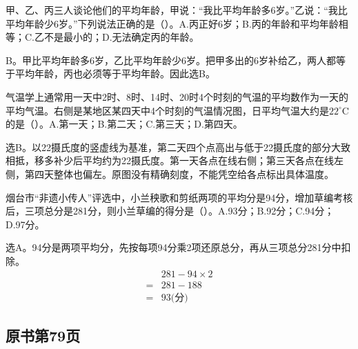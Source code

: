 甲、乙、丙三人谈论他们的平均年龄，甲说：“我比平均年龄多6岁。”乙说：“我比平均年龄少6岁。”下列说法正确的是（\hspace{1.8em}）。A.丙正好6岁；B.丙的年龄和平均年龄相等；C.乙不是最小的；D.无法确定丙的年龄。\par
\begin{BookAnswer}
B。甲比平均年龄多6岁，乙比平均年龄少6岁。把甲多出的6岁补给乙，两人都等于平均年龄，丙也必须等于平均年龄。因此选B。
\end{BookAnswer}

气温学上通常用一天中2时、8时、14时、20时4个时刻的气温的平均数作为一天的平均气温。右侧是某地区某四天中4个时刻的气温情况图，日平均气温大约是\(22^\circ\mathrm C\)的是（\hspace{1.8em}）。A.第一天；B.第二天；C.第三天；D.第四天。\par
{}
\begin{BookAnswer}
选B。以22摄氏度的竖虚线为基准，第二天四个点高出与低于22摄氏度的部分大致相抵，移多补少后平均约为22摄氏度。第一天各点在线右侧；第三天各点在线左侧，第四天整体也偏左。原图没有精确刻度，不能凭空给各点标出具体温度。
\end{BookAnswer}

烟台市“非遗小传人”评选中，小兰秧歌和剪纸两项的平均分是94分，增加草编考核后，三项总分是281分，则小兰草编的得分是（\hspace{1.8em}）。A.93分；B.92分；C.94分；D.97分。\par
\begin{BookAnswer}
选A。94分是两项平均分，先按每项94分乘2项还原总分，再从三项总分281分中扣除。\[\begin{aligned}&281-94\times2\\={}&281-188\\={}&93\text{(分)}\end{aligned}\]
\end{BookAnswer}



\subsection*{原书第79页}

